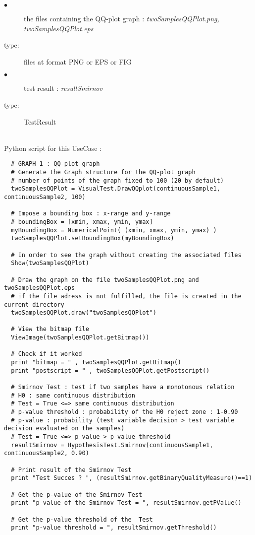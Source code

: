 {
  \begin{description}
  \item[$\bullet$] the files containing the QQ-plot graph : {\itshape twoSamplesQQPlot.png, twoSamplesQQPlot.eps}
  \item[type:]  files at format PNG or EPS or FIG
  \item[$\bullet$] test result : {\itshape resultSmirnov}
  \item[type:] TestResult
  \end{description}
}

\textspace\\
Python script for this UseCase  :

\begin{lstlisting}
  # GRAPH 1 : QQ-plot graph
  # Generate the Graph structure for the QQ-plot graph
  # number of points of the graph fixed to 100 (20 by default)
  twoSamplesQQPlot = VisualTest.DrawQQplot(continuousSample1, continuousSample2, 100)

  # Impose a bounding box : x-range and y-range
  # boundingBox = [xmin, xmax, ymin, ymax]
  myBoundingBox = NumericalPoint( (xmin, xmax, ymin, ymax) )
  twoSamplesQQPlot.setBoundingBox(myBoundingBox)

  # In order to see the graph without creating the associated files
  Show(twoSamplesQQPlot)

  # Draw the graph on the file twoSamplesQQPlot.png and twoSamplesQQPlot.eps
  # if the file adress is not fulfilled, the file is created in the current directory
  twoSamplesQQPlot.draw("twoSamplesQQPlot")

  # View the bitmap file
  ViewImage(twoSamplesQQPlot.getBitmap())

  # Check if it worked
  print "bitmap = " , twoSamplesQQPlot.getBitmap()
  print "postscript = " , twoSamplesQQPlot.getPostscript()

  # Smirnov Test : test if two samples have a monotonous relation
  # H0 : same continuous distribution
  # Test = True <=> same continuous distribution
  # p-value threshold : probability of the H0 reject zone : 1-0.90
  # p-value : probability (test variable decision > test variable decision evaluated on the samples)
  # Test = True <=> p-value > p-value threshold
  resultSmirnov = HypothesisTest.Smirnov(continuousSample1, continuousSample2, 0.90)

  # Print result of the Smirnov Test
  print "Test Succes ? ", (resultSmirnov.getBinaryQualityMeasure()==1)

  # Get the p-value of the Smirnov Test
  print "p-value of the Smirnov Test = ", resultSmirnov.getPValue()

  # Get the p-value threshold of the  Test
  print "p-value threshold = ", resultSmirnov.getThreshold()
\end{lstlisting}



